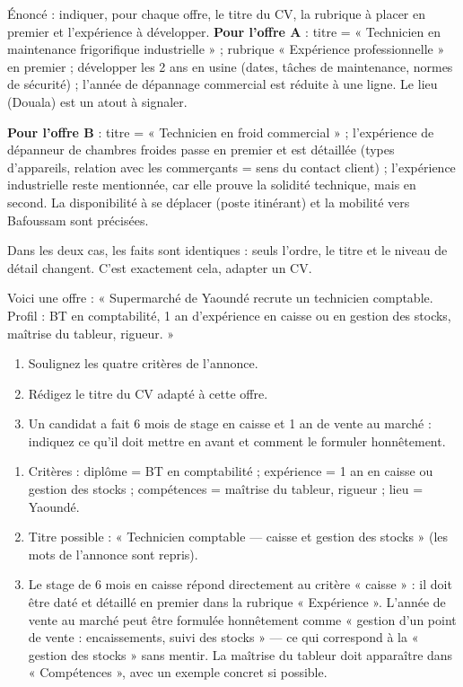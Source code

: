 \documentclass[11pt]{article}
\begin{document}
\begin{exoresolu}
Énoncé : indiquer, pour chaque offre, le titre du CV, la rubrique à placer en premier et l'expérience à développer.
\tcblower
\textbf{Pour l'offre A} : titre = « Technicien en maintenance frigorifique industrielle » ; rubrique « Expérience professionnelle » en premier ; développer les 2 ans en usine (dates, tâches de maintenance, normes de sécurité) ; l'année de dépannage commercial est réduite à une ligne. Le lieu (Douala) est un atout à signaler.

\textbf{Pour l'offre B} : titre = « Technicien en froid commercial » ; l'expérience de dépanneur de chambres froides passe en premier et est détaillée (types d'appareils, relation avec les commerçants = sens du contact client) ; l'expérience industrielle reste mentionnée, car elle prouve la solidité technique, mais en second. La disponibilité à se déplacer (poste itinérant) et la mobilité vers Bafoussam sont précisées.

Dans les deux cas, les faits sont identiques : seuls l'ordre, le titre et le niveau de détail changent. C'est exactement cela, adapter un CV.
\end{exoresolu}

\begin{exercice}
Voici une offre : « Supermarché de Yaoundé recrute un technicien comptable. Profil : BT en comptabilité, 1 an d'expérience en caisse ou en gestion des stocks, maîtrise du tableur, rigueur. »
\begin{enumerate}
\item Soulignez les quatre critères de l'annonce.
\item Rédigez le titre du CV adapté à cette offre.
\item Un candidat a fait 6 mois de stage en caisse et 1 an de vente au marché : indiquez ce qu'il doit mettre en avant et comment le formuler honnêtement.
\end{enumerate}
\end{exercice}

\begin{corrige}
\begin{enumerate}
\item Critères : diplôme = BT en comptabilité ; expérience = 1 an en caisse ou gestion des stocks ; compétences = maîtrise du tableur, rigueur ; lieu = Yaoundé.
\item Titre possible : « Technicien comptable — caisse et gestion des stocks » (les mots de l'annonce sont repris).
\item Le stage de 6 mois en caisse répond directement au critère « caisse » : il doit être daté et détaillé en premier dans la rubrique « Expérience ». L'année de vente au marché peut être formulée honnêtement comme « gestion d'un point de vente : encaissements, suivi des stocks » — ce qui correspond à la « gestion des stocks » sans mentir. La maîtrise du tableur doit apparaître dans « Compétences », avec un exemple concret si possible.
\end{enumerate}
\end{corrige}
\end{document}
